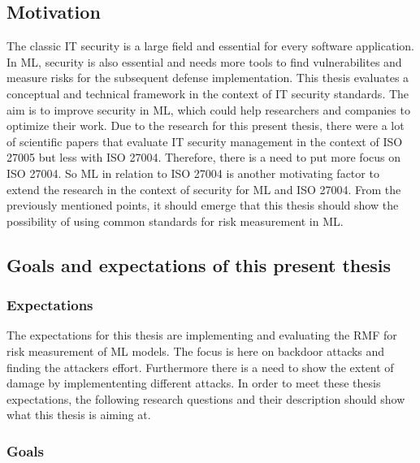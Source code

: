 \subsection{Motivation}

The classic IT security is a large field and essential for every software application. In ML, security is also essential and needs more tools to find vulnerabilites and measure risks for the subsequent
defense implementation. This thesis evaluates a conceptual and technical framework in the context of IT security standards. The aim is to improve security in ML, which could help researchers and
companies to optimize their work. Due to the research for this present thesis, there were a lot of scientific papers that evaluate IT security management in the context of ISO 27005 but less with ISO
27004. Therefore, there is a need to put more focus on ISO 27004. So ML in relation to ISO 27004 is another motivating factor to extend the research in the context of security for ML and ISO 27004. From
the previously mentioned points, it should emerge that this thesis should show the possibility of using common standards for risk measurement in ML.

\subsection{Goals and expectations of this present thesis}


\subsubsection*{Expectations}

The expectations for this thesis are implementing and evaluating the RMF for risk measurement of ML models. The focus is here on backdoor attacks and finding the attackers effort. Furthermore there is a
need to show the extent of damage by implemententing different attacks. In order to meet these thesis expectations, the following research questions and their description should show what this thesis is
aiming at.

\subsubsection*{Goals}

